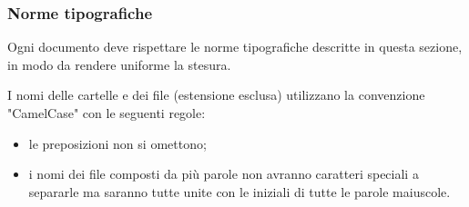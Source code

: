 \subsubsection{Norme tipografiche}
Ogni documento deve rispettare le norme tipografiche descritte in questa sezione, in modo da rendere uniforme la stesura.

I nomi delle cartelle e dei file (estensione esclusa) utilizzano la convenzione "CamelCase" con le seguenti regole:
\begin{itemize}
	\item le preposizioni non si omettono;
	\item i nomi dei file composti da più parole non avranno caratteri speciali a separarle ma saranno tutte unite con le iniziali di tutte le parole maiuscole.
\end{itemize}

